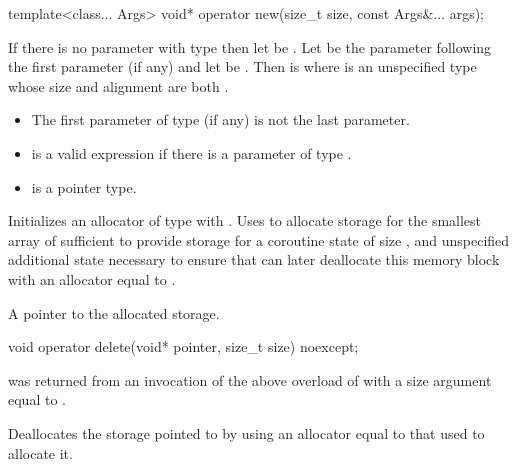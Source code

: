 %
\begin{itemdecl}
template<class... Args>
  void* operator new(size_t size, const Args&... args);
\end{itemdecl}
\begin{itemdescr}
\pnum
If there is no parameter with type  then let
 be .
Let  be the parameter following the first
 parameter (if any) and let 
be .
Then  is  where  is an unspecified type
whose size and alignment are both .

\pnum
\mandates
\begin{itemize}
\item The first parameter of type  (if any) is not the last parameter.
\item {} is a valid expression if there is a parameter
of type .
\item {} is a pointer type.
\end{itemize}

\pnum
\effects
Initializes an allocator  of type  with
.
Uses  to allocate storage for the
smallest array of  sufficient to provide storage for a
coroutine state of size , and unspecified additional
state necessary to ensure that  can later
deallocate this memory block with an allocator equal to .

\pnum
\returns
A pointer to the allocated storage.
\end{itemdescr}

%
\begin{itemdecl}
void operator delete(void* pointer, size_t size) noexcept;
\end{itemdecl}
\begin{itemdescr}
\pnum
\expects
{} was returned from an invocation of the above overload
of  with a size argument equal to .

\pnum
\effects
Deallocates the storage pointed to by  using an
allocator equal to that used to allocate it.
\end{itemdescr}

